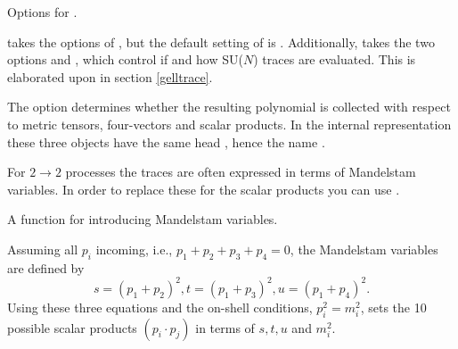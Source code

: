 
 {Options for .}

 takes the options of , but the 
default setting of  is . 
Additionally,  takes the two options  and ,
which control if and how SU($N$) traces are evaluated. This is elaborated upon
in section \ref{gelltrace}.

The option  determines whether the resulting polynomial is 
collected with respect to metric tensors, four-vectors and scalar products. 
In the internal representation these three objects have the same head 
, hence the name .

For $2 \rightarrow 2$ processes the traces are often expressed in terms of 
Mandelstam variables. In order to replace these for the scalar products you can use 
. 

 {A function for introducing Mandelstam variables.}

Assuming all $p_i$ incoming, i.e., $p_1+p_2+p_3+p_4=0$, the Mandelstam variables are defined by
\[
s=(p_1+p_2)^{2}, t=(p_1+p_3)^{2}, u=(p_1+p_4)^{2}.
\]
Using these three equations and the on-shell conditions, $p_i^{2}=m_i^{2}$,  sets the 10 possible scalar products $(p_i \cdot p_j)$ in terms of $s, t, u$ and $m_i^{2}$.

